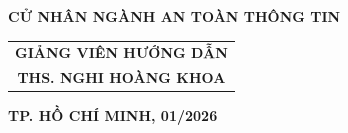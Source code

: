 \begin{titlepage}
    \vspace*{15pt}
    \begin{center}
        \large\textbf{CỬ NHÂN NGÀNH AN TOÀN THÔNG TIN}
    \end{center}
    
    \vspace*{55pt}
    \begin{center}
        \begin{tabular}{c}
            \large\textbf{GIẢNG VIÊN HƯỚNG DẪN} \\
            \large\textbf{THS. NGHI HOÀNG KHOA}
        \end{tabular}
    \end{center}
    
    \vspace*{\fill}
    \begin{center}
        \textbf{TP. HỒ CHÍ MINH, 01/2026}
    \end{center}
\end{titlepage}

% 